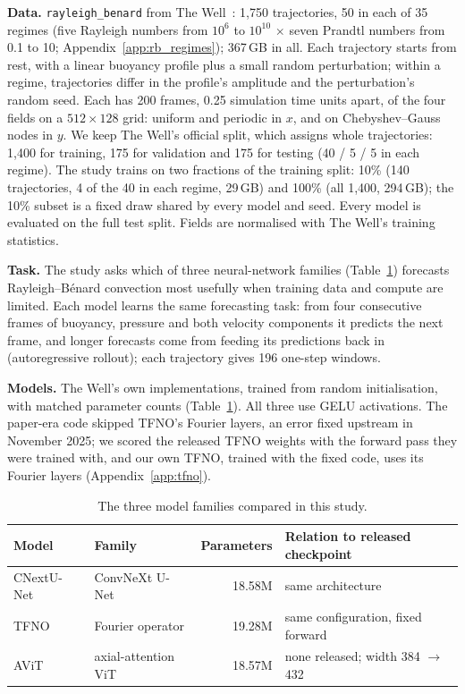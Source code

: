 \documentclass[11pt]{article}
\begin{document}
\textbf{Data.} \texttt{rayleigh\_benard} from The Well~\cite{ohana2024well,wellrb}: 1,750 trajectories, 50 in each
of 35 regimes (five Rayleigh numbers from $10^6$ to $10^{10}$ $\times$ seven Prandtl numbers from 0.1 to 10;
Appendix~\ref{app:rb_regimes}); 367\,GB in all. Each trajectory starts from rest, with a linear buoyancy profile plus
a small random perturbation; within a regime, trajectories differ in the profile's amplitude and the perturbation's
random seed. Each has 200 frames, 0.25 simulation time units apart, of the four fields on a $512\times128$ grid:
uniform and periodic in $x$, and on Chebyshev--Gauss nodes in $y$. We keep The Well's official split, which assigns
whole trajectories: 1,400 for training, 175 for validation and 175 for testing (40 / 5 / 5 in each regime). The
study trains on two fractions of the training split: 10\% (140 trajectories, 4 of the 40 in each regime, 29\,GB)
and 100\% (all 1,400, 294\,GB); the 10\% subset is a fixed draw shared by every model and seed. Every model is
evaluated on the full test split. Fields are normalised with The Well's training statistics.

\textbf{Task.} The study asks which of three neural-network families (Table~\ref{tab:models}) forecasts
Rayleigh--B\'enard convection most usefully when training data and compute are limited. Each model learns the same
forecasting task: from four consecutive frames of buoyancy, pressure and both velocity components it predicts the
next frame, and longer forecasts come from feeding its predictions back in (autoregressive rollout); each trajectory
gives 196 one-step windows.

\textbf{Models.} The Well's own implementations, trained from random initialisation, with matched parameter
counts (Table~\ref{tab:models}). All three use GELU activations. The paper-era code skipped TFNO's Fourier layers, an
error fixed upstream in November 2025; we scored the released TFNO weights with the forward pass they were trained
with, and our own TFNO, trained with the fixed code, uses its Fourier layers (Appendix~\ref{app:tfno}).

\begin{table}[!htbp]
\centering\footnotesize
\begin{tabular*}{\linewidth}{@{\extracolsep{\fill}}llrl@{}}
\toprule
Model & Family & Parameters & Relation to released checkpoint \\
\midrule
CNextU-Net~\cite{liu2022convnext} & ConvNeXt U-Net & 18.58M & same architecture \\
TFNO~\cite{li2021fno,kossaifi2024tfno} & Fourier operator & 19.28M & same configuration, fixed forward \\
AViT~\cite{mccabe2024mpp} & axial-attention ViT & 18.57M & none released; width 384 $\to$ 432 \\
\bottomrule
\end{tabular*}
\caption{The three model families compared in this study.}
\label{tab:models}
\end{table}
\end{document}

